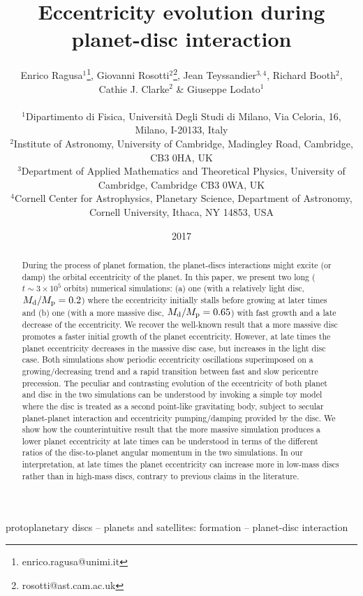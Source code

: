 \documentclass[usenatbib,a4paper,times,fleqn]{mnras}
\title[Eccentricity evolution during planet-disc interaction]{Eccentricity evolution during planet-disc interaction}
\author[Ragusa et al.]{\parbox{0.7\textwidth}{Enrico Ragusa$^{1}$\thanks{enrico.ragusa@unimi.it}, 
Giovanni Rosotti$^{2}$\thanks{rosotti@ast.cam.ac.uk},
Jean Teyssandier$^{3,4}$,
Richard Booth$^{2}$,
Cathie J. Clarke$^{2}$ \&
Giuseppe Lodato$^{1}$ 
} \\
$^{1}$Dipartimento di Fisica, Universit\`a Degli Studi di Milano, Via Celoria, 16, Milano, I-20133, Italy \\
$^{2}$Institute of Astronomy, University of Cambridge, Madingley Road, Cambridge, CB3 0HA, UK \\
$^{3}$Department of Applied Mathematics and Theoretical Physics, University of Cambridge, Cambridge CB3 0WA, UK\\
$^{4}$Cornell Center for Astrophysics, Planetary Science, Department of Astronomy, Cornell University, Ithaca, NY 14853, USA
}
\date{2017}
\begin{document}
\label{firstpage}

\maketitle

\begin{abstract}

During the process of planet formation, the planet-discs interactions might excite (or damp) the orbital eccentricity of the planet. In this paper, we present two long ($t\sim 3\times 10^5$ orbits) numerical simulations: (a) one (with a relatively light disc, $M_{\rm d}/M_{\rm p}=0.2$) where the eccentricity initially stalls before growing at later times and (b) one (with a more massive disc, $M_{\rm d}/M_{\rm p}=0.65$) with fast growth and a late decrease of the eccentricity. We recover the well-known result that a more massive disc promotes a faster initial growth of the planet eccentricity. However, at late times the planet eccentricity decreases in the massive disc case, but increases in the light disc case. Both simulations show periodic eccentricity oscillations superimposed on a growing/decreasing trend and a rapid transition between fast and slow pericentre precession. The peculiar and contrasting evolution of the eccentricity of both planet and disc in the two simulations can be understood by invoking a simple toy model where the disc is treated as a second point-like gravitating body, subject to secular planet-planet interaction and eccentricity pumping/damping provided by the disc.
We show how the counterintuitive result that the more massive simulation produces a lower planet eccentricity at late times can be understood in terms of the different ratios of the disc-to-planet angular momentum in the two simulations. In our interpretation, at late times the planet eccentricity can increase more in low-mass discs rather than in high-mass discs, contrary to previous claims in the literature.

\end{abstract}

\begin{keywords}
 protoplanetary discs -- planets and satellites: formation -- planet-disc interaction %
\end{keywords}

\end{document}
